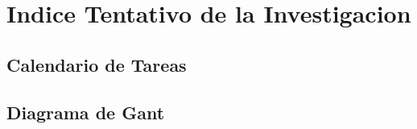 \chapter{Indice Tentativo de la Investigacion}

\section{Calendario de Tareas}

\section{Diagrama de Gant}


